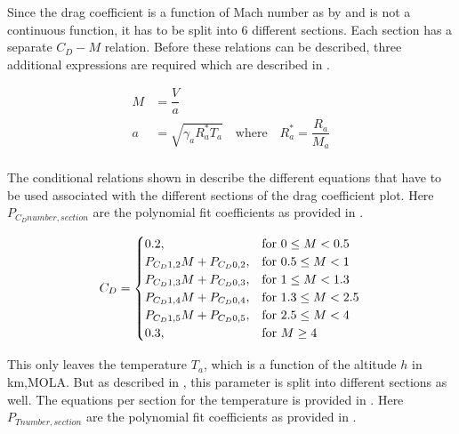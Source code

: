 Since the drag coefficient is a function of Mach number as by  and is not a continuous function, it has to be split into 6 different sections. Each section has a separate $C_{D}-M$ relation. Before these relations can be described, three additional expressions are required which are described in .

 \begin{equation} \label{eq:cdAux}
\begin{split}
M &= \dfrac{V}{a} \\
a &= \sqrt{\gamma_{a}R_{a}^{*}T_{a}} \quad \text{where} \quad R_{a}^{*}=\dfrac{R_{a}}{M_{a}} \\
\end{split}
\end{equation}

The conditional relations shown in  describe the different equations that have to be used associated with the different sections of the drag coefficient plot. Here $P_{C_{D} number,section}$ are the polynomial fit coefficients as provided in .

\begin{equation}\label{eq:cdCond}
C_{D}=\begin{cases}
0.2, & \text{for } 0\leq M < 0.5\\
P_{C_{D} 1,2}M+P_{C_{D} 0,2}, &  \text{for } 0.5\leq M < 1 \\
P_{C_{D} 1,3}M+P_{C_{D} 0,3}, &  \text{for } 1\leq M < 1.3 \\
P_{C_{D} 1,4}M+P_{C_{D} 0,4}, &  \text{for } 1.3\leq M < 2.5 \\
P_{C_{D} 1,5}M+P_{C_{D} 0,5}, &  \text{for } 2.5\leq M < 4 \\
0.3, &  \text{for } M \geq 4 
\end{cases}\\
\end{equation}

This only leaves the temperature $T_{a}$, which is a function of the altitude $h$ in km,\ac{MOLA}. But as described in , this parameter is split into different sections as well. The equations per section for the temperature is provided in . Here $P_{T number,section}$ are the polynomial fit coefficients as provided in .

